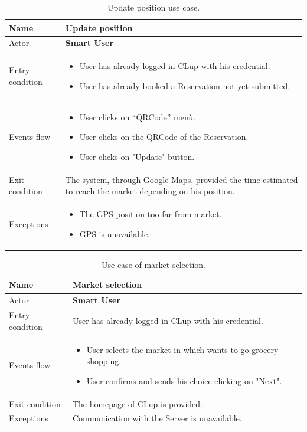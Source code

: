 \begin{table}[H]\begin{tabular}{|p{5cm} | p{7cm} | }
	\hline
	Name & \textbf{Update position}  \\
	\hline
	Actor & \textbf{Smart User} \\
	\hline
	Entry condition &
	\begin{itemize}
	    \item User has already logged in CLup with his credential. 
		\item User has already booked a Reservation not yet submitted.
        \end{itemize} \\
	\hline
	Events flow & 
	\begin{itemize}
		\item User clicks on “QRCode” menù.
        \item User clicks on the QRCode of the Reservation.
        \item User clicks on "Update" button.
	\end{itemize} \\
	\hline
	Exit condition &
	The system, through Google Maps, provided the time estimated to reach the market depending on his position. \\
	\hline 
	Exceptions & 
	\begin{itemize}
		\item The GPS position too far from market.
		\item GPS is unavailable.
	\end{itemize} \\
	\hline
\end{tabular}
\caption{Update position use case.}

\end{table}

\bigbreak

\begin{table}[H]\begin{tabular}{|p{5cm} | p{7cm} | }
	\hline
	Name & \textbf{Market selection}  \\
	\hline
	Actor & \textbf{Smart User} \\
	\hline
	Entry condition & User has already logged in CLup with his credential. \\
	\hline
	Events flow & 
	\begin{itemize}
		\item User selects the market in which wants to go grocery shopping.
		\item User confirms and sends his choice clicking on "Next". 
	\end{itemize} \\
	\hline
	Exit condition &
	The homepage of CLup is provided.  \\
	\hline 
	Exceptions & Communication with the Server is unavailable.\\
	\hline
\end{tabular}
\caption{Use case of market selection.}
\end{table}

